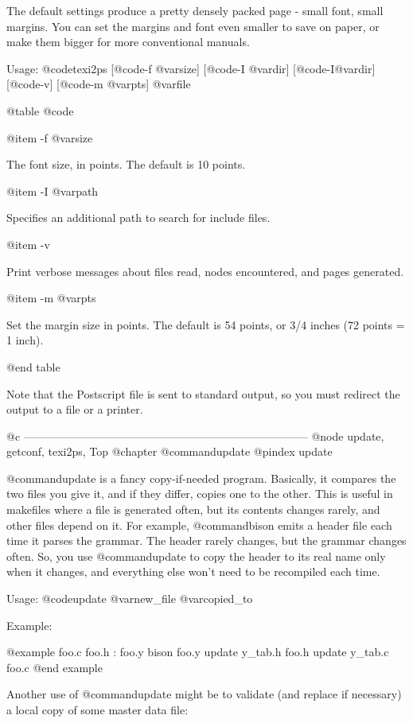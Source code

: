 The default settings produce a pretty densely packed page - small font,
small margins.  You can set the margins and font even smaller to save on
paper, or make them bigger for more conventional manuals.

Usage: @code{texi2ps} [@code{-f} @var{size}] [@code{-I} @var{dir}]
[@code{-I}@var{dir}] [@code{-v}] [@code{-m} @var{pts}] @var{file}

@table @code

@item -f @var{size}

The font size, in points.  The default is 10 points.

@item -I @var{path}

Specifies an additional path to search for include files.

@item -v

Print verbose messages about files read, nodes encountered, and pages
generated.

@item -m @var{pts}

Set the margin size in points.  The default is 54 points, or 3/4 inches
(72 points = 1 inch).

@end table

Note that the Postscript file is sent to standard output, so you must
redirect the output to a file or a printer.

@c -----------------------------------------------------------------------------
@node update, getconf, texi2ps, Top
@chapter @command{update}
@pindex update

@command{update} is a fancy copy-if-needed program.  Basically, it compares
the two files you give it, and if they differ, copies one to the other.
This is useful in makefiles where a file is generated often, but its
contents changes rarely, and other files depend on it.  For example,
@command{bison} emits a header file each time it parses the grammar.  The
header rarely changes, but the grammar changes often.  So, you use
@command{update} to copy the header to its real name only when it changes,
and everything else won't need to be recompiled each time.

Usage: @code{update} @var{new_file} @var{copied_to}

Example:

@example
foo.c foo.h : foo.y
        bison foo.y
        update y_tab.h foo.h
        update y_tab.c foo.c
@end example

Another use of @command{update} might be to validate (and replace if
necessary) a local copy of some master data file:

